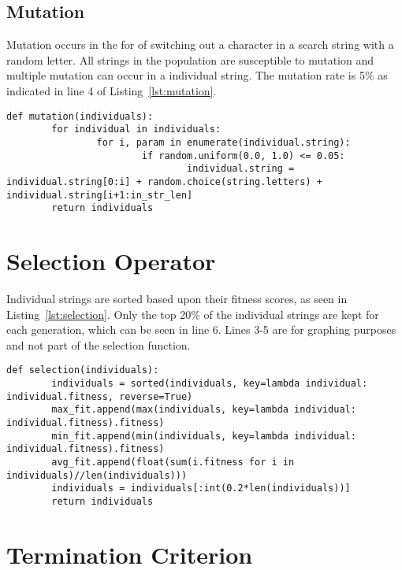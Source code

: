 \documentclass[conference]{IEEEtrans}
\begin{document}
\subsection{Mutation}

Mutation occurs in the for of switching out a character in a search string with
a random letter.  All strings in the population are susceptible to mutation and
multiple mutation can occur in a individual string.  The mutation rate is 5\% as
indicated in line 4 of Listing~\ref{lst:mutation}.

\begin{lstlisting}[caption = {Mutation Function}, label={lst:mutation}]
def mutation(individuals):
        for individual in individuals:
                for i, param in enumerate(individual.string):
                        if random.uniform(0.0, 1.0) <= 0.05:
                                individual.string = individual.string[0:i] + random.choice(string.letters) + individual.string[i+1:in_str_len]
        return individuals
\end{lstlisting}


\section{Selection Operator}

Individual strings are sorted based upon their fitness scores, as seen in
Listing~\ref{lst:selection}.  Only the top 20\% of the individual strings are
kept for each generation, which can be seen in line 6.  Lines 3-5 are for
graphing purposes and not part of the selection function.

\begin{lstlisting}[caption = {Selection Function}, label = {lst:selection}]
def selection(individuals):
        individuals = sorted(individuals, key=lambda individual: individual.fitness, reverse=True)
        max_fit.append(max(individuals, key=lambda individual: individual.fitness).fitness)
        min_fit.append(min(individuals, key=lambda individual: individual.fitness).fitness)
        avg_fit.append(float(sum(i.fitness for i in individuals)//len(individuals)))
        individuals = individuals[:int(0.2*len(individuals))]
        return individuals
\end{lstlisting}

\section{Termination Criterion}
\end{document}
